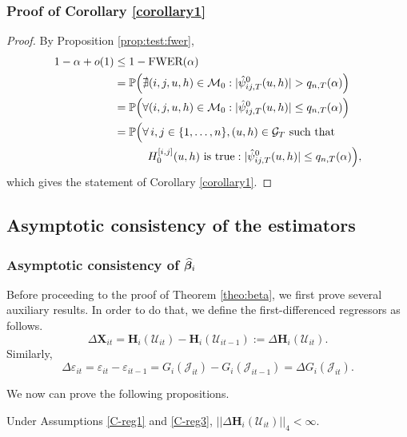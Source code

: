 \subsubsection*{Proof of Corollary \ref{corollary1}}\label{subsec:app:corollary}
\begin{proof}
By Proposition \ref{prop:test:fwer}, 
\begin{align*}
1 - \alpha + o(1) 
 & \le 1 - \textnormal{FWER}(\alpha) \\
 & = \mathbb{P} \Big( \nexists (i,j,u, h) \in \mathcal{M}_0: |\hat{\psi}^0_{ij,T}(u, h)| > q_{n, T}(\alpha) \Big) \\
& = \mathbb{P}\Big( \forall (i,j,u, h) \in \mathcal{M}_0: |\hat{\psi}^0_{ij,T}(u, h)| \le q_{n, T}(\alpha) \Big)\\
&=\mathbb{P}\Big( \forall \, i,j \in \{1, \ldots, n\}, (u, h) \in \mathcal{G}_T \text{ such that }\\
&\quad\quad \quad H_0^{[i, j]}(u, h) \text{ is true}: |\hat{\psi}^0_{ij,T}(u, h)| \le q_{n,T}(\alpha) \Big),
\end{align*}
which gives the statement of Corollary \ref{corollary1}.
\end{proof}


\subsection{Asymptotic consistency of the estimators}

\subsubsection{Asymptotic consistency of $\widehat{\bm{\beta}}_i$}\label{subsec:app:beta}

Before proceeding to the proof of Theorem \ref{theo:beta}, we first prove several auxiliary results. In order to do that, we define the first-differenced regressors as follows.
\[ \Delta \mathbf{X}_{it} =\mathbf{H}_i(\mathcal{U}_{it}) - \mathbf{H}_i(\mathcal{U}_{it-1}) := \Delta \mathbf{H}_i(\mathcal{U}_{it}). \]
Similarly, 
\[\Delta \varepsilon_{it} = \varepsilon_{it} - \varepsilon_{it-1} = G_i(\mathcal{J}_{it}) - G_i(\mathcal{J}_{it-1}) = \Delta G_i(\mathcal{J}_{it}).
\]
 
We now can prove the following propositions.
\begin{propA}\label{propA:beta1}
Under Assumptions \ref{C-reg1} and \ref{C-reg3}, $|| \Delta \mathbf{H}_i(\mathcal{U}_{it})||_4 < \infty$.
\end{propA}



